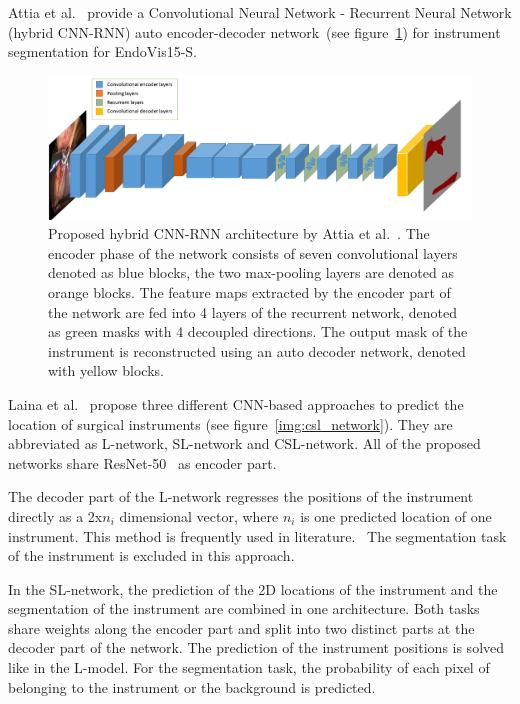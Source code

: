 Attia et al.~\cite{Attia2017_surg_tool_cnn-rnn} provide a Convolutional Neural Network - Recurrent Neural Network (hybrid CNN-RNN) auto encoder-decoder network~(see figure~\ref{img:hybrid_cnn_rnn}) for instrument segmentation for EndoVis15-S.

\begin{figure}
	\centering
	\includegraphics[width=.8\textwidth]{images/networks/hybrid_cnn_rnn.png}
	\caption[CNN-RNN architecture~\cite{Attia2017_surg_tool_cnn-rnn}]{Proposed hybrid CNN-RNN architecture by Attia et al.~\cite{Attia2017_surg_tool_cnn-rnn}.
	The encoder phase of the network consists of seven convolutional layers denoted as blue blocks, 
	the two max-pooling layers are denoted as orange blocks. 
	The feature maps extracted by the encoder part of the network are fed into 4 layers of the recurrent network, denoted as green masks
	with 4 decoupled directions. The output mask of the instrument is reconstructed using an auto decoder network, denoted with yellow blocks.}
	\label{img:hybrid_cnn_rnn}
\end{figure}

Laina et al.~\cite{Laina2017} propose three different CNN-based approaches to predict the location of surgical instruments (see figure~\ref{img:csl_network}).
They are abbreviated as L-network, SL-network and CSL-network. 
All of the proposed networks share ResNet-50~\cite{deep_res_learning_img_rec2016He} as encoder part.

The decoder part of the L-network regresses the positions of the instrument directly as a 2x$n_i$ dimensional vector, where $n_i$ is one predicted location of one instrument. This method is frequently used in literature.~\cite{landmark_localization_2Dvector2016rupprecht}
The segmentation task of the instrument is excluded in this approach.

In the SL-network, the prediction of the 2D locations of the instrument and the segmentation of the instrument are combined in one architecture. 
Both tasks share weights along the encoder part and split into two distinct parts at the decoder part of the network. The prediction of the instrument positions is solved like in the L-model.
For the segmentation task, the probability of each pixel of belonging to the instrument or the background is predicted.

